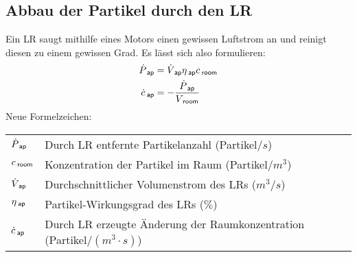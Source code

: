 \documentclass[12pt,a4paper,bibtotocnumbered,liststotocnumbered]{scrreprt}
\newenvironment{parameterNames}{Neue Formelzeichen:\\ \begin{tabular}{ll}}{\end{tabular} \\ \\}
\begin{document}
\subsection{Abbau der Partikel durch den \acl{LR}}
Ein \ac{LR} saugt mithilfe eines Motors einen gewissen Luftstrom an und reinigt diesen zu einem gewissen Grad. Es lässt sich also formulieren:
\begin{align}
\dot{P}_{\: \mathsf{ap}} &=\dot{V}_{\: \mathsf{ap}} \eta_{\: \mathsf{ap}} c_{\: \mathsf{room}}\\
\dot{c}_{\: \mathsf{ap}} &=-\frac{\dot{P}_{\: \mathsf{ap}}}{V_{\: \mathsf{room}}}
\end{align}
\begin{parameterNames}
$\dot{P}_{\: \mathsf{ap}}$ & Durch \ac{LR} entfernte Partikelanzahl (Partikel$/s$)\\
$c_{\: \mathsf{room}}$ & Konzentration der Partikel im Raum (Partikel$/m^3$)\\
$\dot{V}_{\: \mathsf{ap}}$ & Durchschnittlicher Volumenstrom des \acp{LR} ($m^3/s$)\\
$\eta_{\: \mathsf{ap}}$ & Partikel-Wirkungsgrad des \acp{LR} ($\%$)\\
$\dot{c}_{\: \mathsf{ap}}$ & Durch \ac{LR} erzeugte Änderung der  Raumkonzentration (Partikel$/(m^3\cdot s)$)\\
\end{parameterNames}
\end{document}
